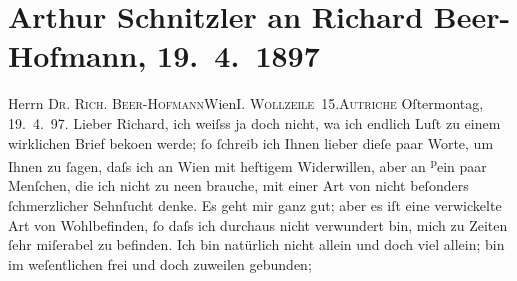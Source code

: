 

               \section[Arthur Schnitzler an Richard Beer-Hofmann, 19. 4. 1897]{ Arthur Schnitzler an Richard Beer-Hofmann, 19. 4. 1897}\nopagebreak{}\rehead{ }\begin{ledgroupsized}[t]{13cm}\normalsize\beginnumbering{} \toendnotes[C]{\smallbreak\pagebreak[2]} 
\toendnotes[C]{\smallbreak}\pstart{}{\pb}Herrn \textsc{Dr. Rich.
                     Beer-Hofmann}\pend{}\pstart{}Wien\pend{}\pstart{}\textsc{I. Wollzeile 15}.\pend{}\pstart{}\textsc{Autriche}\pend{}{\bigskip}\pstart
           \raggedleft{}{\pb}Oſtermontag, 19. 4. 97.\pend
           \pstart
           Lieber Richard, ich weiſss ja doch nicht, wa{\geminationn} ich endlich Luſt zu einem wirklichen Brief beko{\geminationm}en werde; ſo ſchreib ich Ihnen lieber dieſe paar Worte,
               um Ihnen zu ſagen, daſs ich an Wien mit heftigem
               Widerwillen, aber an \substVorne{}\textsuperscript{p}\substDazwischen{}e\substHinten{}in paar Menſchen, die ich nicht zu ne{\geminationn}en
               brauche, mit einer Art \introOben{}von\introOben{} nicht beſonders {\pb}ſchmerzlicher Sehnſucht denke. Es geht mir ganz gut;
               aber es iſt eine verwickelte Art von Wohlbefinden, ſo daſs ich durchaus nicht
               verwundert bin, mich zu Zeiten ſehr miſerabel zu befinden. Ich bin natürlich nicht
               allein und doch viel allein; bin im weſentlichen frei und doch zuweilen gebunden;

\end{ledgroupsized}
